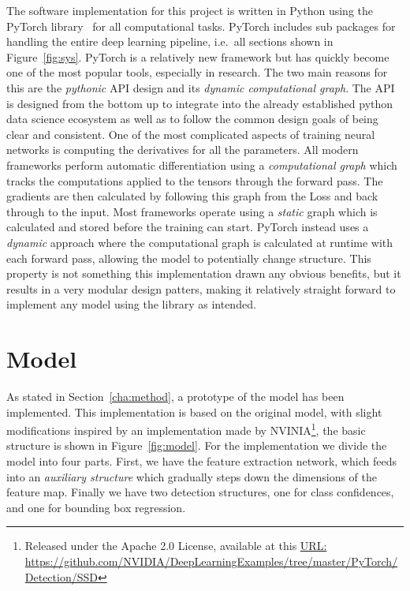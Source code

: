 The software implementation for this project is written in Python using the PyTorch library~\parencite{NEURIPS2019_9015} for all computational tasks.
PyTorch includes sub packages for handling the entire deep learning pipeline, i.e.~all sections shown in Figure~\ref{fig:sys}.
PyTorch is a relatively new framework but has quickly become one of the most popular tools, especially in research.
The two main reasons for this are the \textit{pythonic} API design and its \textit{dynamic computational graph}.
The API is designed from the bottom up to integrate into the already established python data science ecosystem as well as to follow the common design goals of being clear and consistent.
One of the most complicated aspects of training neural networks is computing the derivatives for all the parameters.
All modern frameworks perform automatic differentiation using a \textit{computational graph} which tracks the computations applied to the tensors through the forward pass.
The gradients are then calculated by following this graph from the Loss and back through to the input.
Most frameworks operate using a \textit{static} graph which is calculated and stored before the training can start.
PyTorch instead uses a \textit{dynamic} approach where the computational graph is calculated at runtime with each forward pass, allowing the model to potentially change structure.
This property is not something this implementation drawn any obvious benefits, but it results in a very modular design patters, making it relatively straight forward to implement any model using the library as intended.  

\section*{Model}
As stated in Section~\ref{cha:method}, a prototype of the model has been implemented.
This implementation is based on the original model, with slight modifications inspired by an implementation made by NVINIA\footnote{Released under the Apache 2.0 License, available at this \href{https://github.com/NVIDIA/DeepLearningExamples/tree/master/PyTorch/Detection/SSD}{URL:} \url{https://github.com/NVIDIA/DeepLearningExamples/tree/master/PyTorch/Detection/SSD}}, the basic structure is shown in Figure~\ref{fig:model}.
For the implementation we divide the model into four parts.
First, we have the feature extraction network, which feeds into an \textit{auxiliary structure} which gradually steps down the dimensions of the feature map.
Finally we have two detection structures, one for class confidences, and one for bounding box regression.

